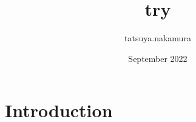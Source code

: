 \documentclass{article}
\title{try}
\author{tatsuya.nakamura }
\date{September 2022}
\begin{document}
\maketitle

\section{Introduction}
\end{document}
